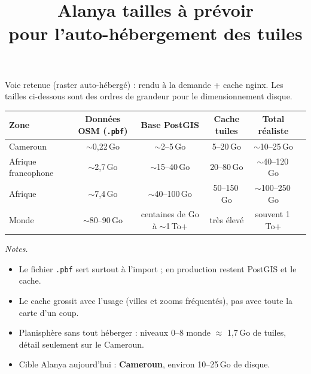 \documentclass[a4paper,11pt]{article}
\title{Alanya tailles à prévoir\\pour l'auto-hébergement des tuiles}
\author{}
\date{}
\begin{document}
\maketitle
\thispagestyle{empty}

\noindent
Voie retenue (raster auto-hébergé) : rendu à la demande + cache nginx.
Les tailles ci-dessous sont des ordres de grandeur pour le dimensionnement disque.

\vspace{1.2em}

{\small
\renewcommand{\arraystretch}{1.35}
\begin{tabularx}{\textwidth}{@{}>{\raggedright\arraybackslash}p{2.8cm}cccc>{\raggedright\arraybackslash}X@{}}
\toprule
\textbf{Zone}
  & \textbf{Données OSM} (\texttt{.pbf})
  & \textbf{Base PostGIS}
  & \textbf{Cache tuiles}
  & \textbf{Total réaliste} \\
\midrule
Cameroun
  & $\sim$0,22\,Go
  & $\sim$2--5\,Go
  & 5--20\,Go
  & $\sim$10--25\,Go \\
Afrique francophone
  & $\sim$2,7\,Go
  & $\sim$15--40\,Go
  & 20--80\,Go
  & $\sim$40--120\,Go \\
Afrique
  & $\sim$7,4\,Go
  & $\sim$40--100\,Go
  & 50--150\,Go
  & $\sim$100--250\,Go \\
Monde
  & $\sim$80--90\,Go
  & centaines de Go à $\sim$1\,To+
  & très élevé
  & souvent 1\,To+ \\
\bottomrule
\end{tabularx}
}

\vspace{1.5em}

\noindent\textit{Notes.}
\begin{itemize}
  \itemsep0.35em
  \item Le fichier \texttt{.pbf} sert surtout à l'import ; en production restent PostGIS et le cache.
  \item Le cache grossit avec l'usage (villes et zooms fréquentés), pas avec toute la carte d'un coup.
  \item Planisphère sans tout héberger : niveaux 0--8 monde $\approx$ 1,7\,Go de tuiles, détail seulement sur le Cameroun.
  \item Cible Alanya aujourd'hui : \textbf{Cameroun}, environ 10--25\,Go de disque.
\end{itemize}
\end{document}
